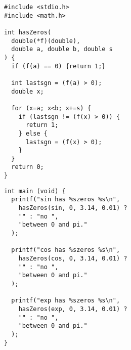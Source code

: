 
\begin{frame}[fragile]
%
\begin{codebox}
\begin{verbatim}
#include <stdio.h>
#include <math.h>

int hasZeros(
  double(*f)(double), 
  double a, double b, double s 
) {
  if (f(a) == 0) {return 1;}
  
  int lastsgn = (f(a) > 0);
  double x;
  
  for (x=a; x<b; x+=s) {
    if (lastsgn != (f(x) > 0)) {
      return 1;
    } else {
      lastsgn = (f(x) > 0);
    }
  }
  return 0;
}
\end{verbatim}
\end{codebox}
%
\begin{codebox}[...Fortsetzung]
\begin{verbatim}
int main (void) {
  printf("sin has %szeros %s\n",
    hasZeros(sin, 0, 3.14, 0.01) ? 
    "" : "no ",
    "between 0 and pi."
  );
  
  printf("cos has %szeros %s\n",
    hasZeros(cos, 0, 3.14, 0.01) ? 
    "" : "no ",
    "between 0 and pi."
  );
  
  printf("exp has %szeros %s\n",
    hasZeros(exp, 0, 3.14, 0.01) ? 
    "" : "no ",
    "between 0 and pi."
  );
}
\end{verbatim}
\end{codebox}
%
\end{frame}


